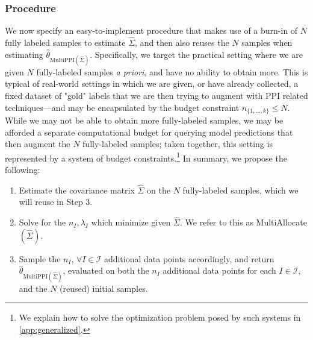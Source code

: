 \documentclass{article} %
\newcommand{\charlie}[1]{ {\color{red}[CCB: #1]}}
\newcommand{\adam}[1]{ {\color{magenta}[AF: #1]}}
\newcommand{\wh}[1]{\widehat{#1}}
\begin{document}
\subsubsection{Procedure}
\label{sec:procedure}
We now specify an easy-to-implement procedure that makes use of a burn-in of $N$ fully labeled samples to estimate $\widehat{\Sigma}$, and then also reuses the $N$ samples when estimating $\hat{\theta}_{\text{MultiPPI}(\widehat{\Sigma})}$. Specifically, we target the practical setting where we are given $N$ fully-labeled samples  \textit{a priori}, and have no ability to obtain more. This is typical of real-world settings in which we are given, or have already collected, a fixed dataset of "gold" labels that we are then trying to augment with PPI related techniques---and may be encapsulated by the budget constraint $n_{\{1, \ldots, k\}}\leq N$. While we may not be able to obtain more fully-labeled samples, we may be afforded a separate computational budget for querying model predictions that then augment the $N$ fully-labeled samples; taken together, this setting is represented by a system of budget constraints.\footnote{We explain how to solve the optimization problem posed by such systems in \autoref{app:generalized}.} In summary, we propose the following:
\begin{enumerate}[leftmargin=*]
    \item Estimate the covariance matrix $\widehat{\Sigma}$ on the $N$ fully-labeled samples, which we will reuse in Step 3.
    \item Solve for the $n_I,\lambda_I$ which minimize  given $\wh{\Sigma}$. We refer to this as MultiAllocate$(\widehat{\Sigma})$. %
    \item Sample the $n_I$, $\forall I \in \mathcal{I}$ additional data points accordingly, and return $\hat{\theta}_{\text{MultiPPI}(\widehat{\Sigma})}$, evaluated on both the $n_I$ additional data points for each $I\in\mathcal{I}$, and the $N$ (reused) initial samples.
\end{enumerate}
\end{document}
